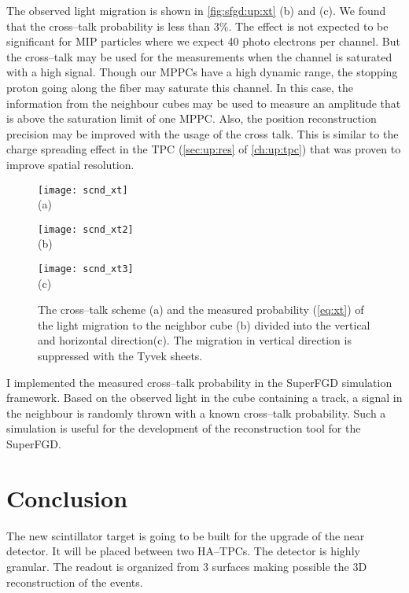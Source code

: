 \documentclass[main.tex]{subfiles}
\begin{document}
The observed light migration is shown in \autoref{fig:sfgd:up:xt} (b) and (c). We found that the cross--talk probability is less than 3\%. The effect is not expected to be significant for MIP particles where we expect 40 photo electrons per channel. But the cross--talk may be used for the measurements when the channel is saturated with a high signal. Though our MPPCs have a high dynamic range, the stopping proton going along the fiber may saturate this channel. In this case, the information from the neighbour cubes may be used to measure an amplitude that is above the saturation limit of one MPPC. Also, the position reconstruction precision may be improved with the usage of the cross talk. This is similar to the charge spreading effect in the TPC (\autoref{sec:up:res} of \autoref{ch:up:tpc}) that was proven to improve spatial resolution.

\begin{figure}[!ht]
	\centering
	\begin{minipage}{0.33\linewidth}
		\centering
		\texttt{[image: scnd\_xt]} \\ (a)
	\end{minipage}
	\begin{minipage}{0.33\linewidth}
		\centering
		\texttt{[image: scnd\_xt2]} \\ (b)
	\end{minipage}
	\begin{minipage}{0.33\linewidth}
		\centering
		\texttt{[image: scnd\_xt3]} \\ (c)
	\end{minipage}
	\caption{The cross--talk scheme (a) and the measured probability (\autoref{eq:xt}) of the light migration to the neighbor cube (b) divided into the vertical and horizontal direction(c). The migration in vertical direction is suppressed with the Tyvek sheets.}
	\label{fig:sfgd:up:xt}
\end{figure}
I implemented the measured cross--talk probability in the SuperFGD simulation framework. Based on the observed light in the cube containing a track, a signal in the neighbour is randomly thrown with a known cross--talk probability. Such a simulation is useful for the development of the reconstruction tool for the SuperFGD.

\section{Conclusion}
The new scintillator target is going to be built for the upgrade of the near detector. It will be placed between two HA--TPCs. The detector is highly granular. The readout is organized from 3 surfaces making possible the 3D reconstruction of the events.
\end{document}
